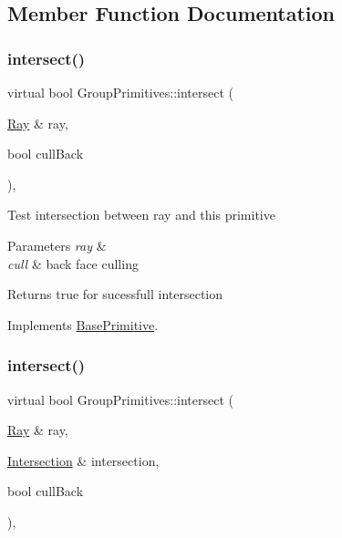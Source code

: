 \subsection{Member Function Documentation}
\mbox{\label{class_group_primitives_a17bca38224e782eb6660774b34947397}} 
\subsubsection{\texorpdfstring{intersect()}{intersect()}\hspace{0.1cm}{\footnotesize\ttfamily [1/2]}}
{\footnotesize\ttfamily virtual bool Group\+Primitives\+::intersect (\begin{DoxyParamCaption}\item[{\mbox{\hyperlink{class_ray}{Ray}} \&}]{ray,  }\item[{bool}]{cull\+Back }\end{DoxyParamCaption})\hspace{0.3cm}{\ttfamily [inline]}, {\ttfamily [virtual]}}

Test intersection between ray and this primitive 
\begin{DoxyParams}{Parameters}
{\em ray} & \\
\hline
{\em cull} & back face culling \\
\hline
\end{DoxyParams}
\begin{DoxyReturn}{Returns}
true for sucessfull intersection 
\end{DoxyReturn}


Implements \mbox{\hyperlink{class_base_primitive_a608aa970836909d21c0413d894612eca}{Base\+Primitive}}.

\mbox{\label{class_group_primitives_ac958af04e2e275f28cb74751ad87575a}} 
\subsubsection{\texorpdfstring{intersect()}{intersect()}\hspace{0.1cm}{\footnotesize\ttfamily [2/2]}}
{\footnotesize\ttfamily virtual bool Group\+Primitives\+::intersect (\begin{DoxyParamCaption}\item[{\mbox{\hyperlink{class_ray}{Ray}} \&}]{ray,  }\item[{\mbox{\hyperlink{class_intersection}{Intersection}} \&}]{intersection,  }\item[{bool}]{cull\+Back }\end{DoxyParamCaption})\hspace{0.3cm}{\ttfamily [inline]}, {\ttfamily [virtual]}}

